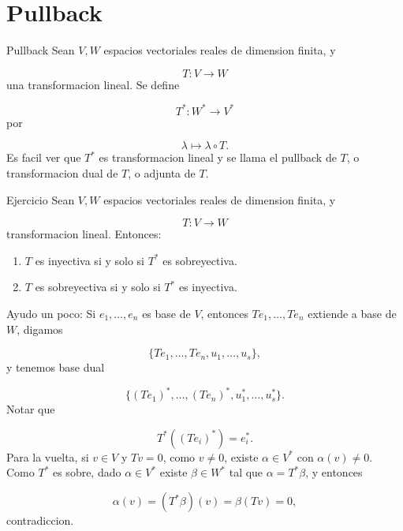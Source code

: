 \section{Pullback}
\begin{bookdefinition}{Pullback}
Sean $V,W$ espacios vectoriales reales de dimension finita, y

\[
T:V \to W
\]
una transformacion lineal. Se define

\[
T^*:W^* \to V^*
\]
por

\[
\lambda \mapsto \lambda \circ T.
\]
Es facil ver que $T^*$ es transformacion lineal y se llama el pullback de $T$, o transformacion dual de $T$, o adjunta de $T$.

\end{bookdefinition}
\begin{bookproposition}{Ejercicio}
Sean $V,W$ espacios vectoriales reales de dimension finita, y

\[
T:V \to W
\]
transformacion lineal. Entonces:

\begin{enumerate}
\item $T$ es inyectiva si y solo si $T^*$ es sobreyectiva.
\item $T$ es sobreyectiva si y solo si $T^*$ es inyectiva.
\end{enumerate}
Ayudo un poco: Si $e_1,\ldots,e_n$ es base de $V$, entonces $Te_1,\ldots,Te_n$ extiende a base de $W$, digamos

\[
\{Te_1,\ldots,Te_n,u_1,\ldots,u_s\},
\]
y tenemos base dual

\[
\{(Te_1)^*,\ldots,(Te_n)^*,u_1^*,\ldots,u_s^*\}.
\]
Notar que

\[
T^*((Te_i)^*)=e_i^*.
\]
Para la vuelta, si $v \in V$ y $Tv=0$, como $v \ne 0$, existe $\alpha \in V^*$ con $\alpha(v)\ne 0$. Como $T^*$ es sobre, dado $\alpha \in V^*$ existe $\beta \in W^*$ tal que $\alpha=T^*\beta$, y entonces

\[
\alpha(v)=(T^*\beta)(v)=\beta(Tv)=0,
\]
contradiccion.

\end{bookproposition}
